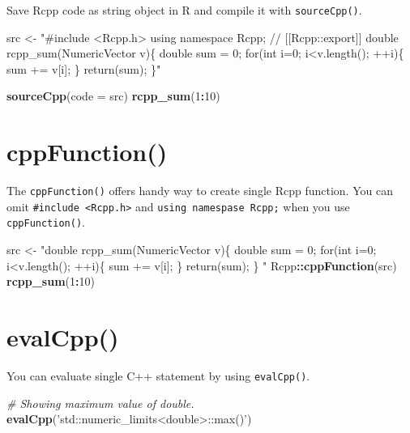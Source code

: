 \documentclass[]{book}
\newenvironment{Shaded}{\begin{snugshade}}{\end{snugshade}}
\newcommand{\CommentTok}[1]{\textcolor[rgb]{0.56,0.35,0.01}{\textit{#1}}}
\newcommand{\DataTypeTok}[1]{\textcolor[rgb]{0.13,0.29,0.53}{#1}}
\newcommand{\DecValTok}[1]{\textcolor[rgb]{0.00,0.00,0.81}{#1}}
\newcommand{\KeywordTok}[1]{\textcolor[rgb]{0.13,0.29,0.53}{\textbf{#1}}}
\newcommand{\NormalTok}[1]{#1}
\newcommand{\OperatorTok}[1]{\textcolor[rgb]{0.81,0.36,0.00}{\textbf{#1}}}
\newcommand{\StringTok}[1]{\textcolor[rgb]{0.31,0.60,0.02}{#1}}
\begin{document}
Save Rcpp code as string object in R and compile it with \texttt{sourceCpp()}.

\begin{Shaded}
\begin{Highlighting}[]
\NormalTok{src <-}
\StringTok{"#include <Rcpp.h>}
\StringTok{using namespace Rcpp;}
\StringTok{// [[Rcpp::export]]}
\StringTok{double rcpp_sum(NumericVector v)\{}
\StringTok{  double sum = 0;}
\StringTok{  for(int i=0; i<v.length(); ++i)\{}
\StringTok{    sum += v[i];}
\StringTok{  \}}
\StringTok{  return(sum);}
\StringTok{\}"}

\KeywordTok{sourceCpp}\NormalTok{(}\DataTypeTok{code =}\NormalTok{ src)}
\KeywordTok{rcpp_sum}\NormalTok{(}\DecValTok{1}\OperatorTok{:}\DecValTok{10}\NormalTok{)}
\end{Highlighting}
\end{Shaded}

\hypertarget{cppfunction}{%
\section{cppFunction()}\label{cppfunction}}

The \texttt{cppFunction()} offers handy way to create single Rcpp function. You can omit \texttt{\#include\ \textless{}Rcpp.h\textgreater{}} and \texttt{using\ namespase\ Rcpp;} when you use \texttt{cppFunction()}.

\begin{Shaded}
\begin{Highlighting}[]
\NormalTok{src <-}
\StringTok{  "double rcpp_sum(NumericVector v)\{}
\StringTok{    double sum = 0;}
\StringTok{    for(int i=0; i<v.length(); ++i)\{}
\StringTok{      sum += v[i];}
\StringTok{    \}}
\StringTok{    return(sum);}
\StringTok{  \}}
\StringTok{  "}
\NormalTok{Rcpp}\OperatorTok{::}\KeywordTok{cppFunction}\NormalTok{(src)}
\KeywordTok{rcpp_sum}\NormalTok{(}\DecValTok{1}\OperatorTok{:}\DecValTok{10}\NormalTok{)}
\end{Highlighting}
\end{Shaded}

\hypertarget{evalcpp}{%
\section{evalCpp()}\label{evalcpp}}

You can evaluate single C++ statement by using \texttt{evalCpp()}.

\begin{Shaded}
\begin{Highlighting}[]
\CommentTok{# Showing maximum value of double.}
\KeywordTok{evalCpp}\NormalTok{(}\StringTok{'std::numeric_limits<double>::max()'}\NormalTok{)}
\end{Highlighting}
\end{Shaded}
\end{document}
